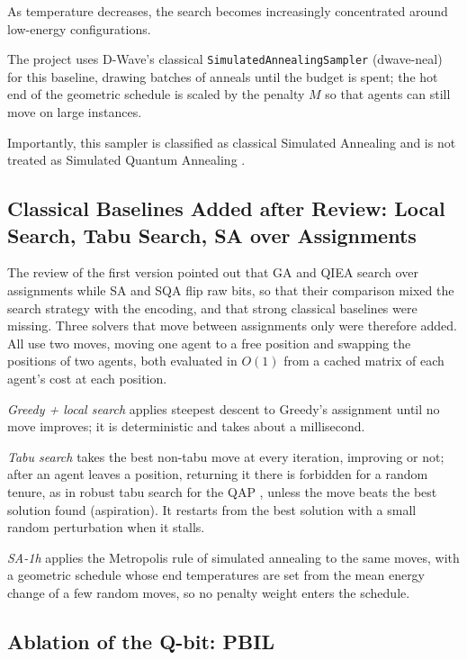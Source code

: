 \documentclass[12pt, a4paper]{article}
\begin{document}
As temperature decreases, the search becomes increasingly concentrated around low-energy configurations.

The project uses D-Wave's classical \texttt{SimulatedAnnealingSampler} (dwave-neal) for this baseline, drawing batches of anneals until the budget is spent; the hot end of the geometric schedule is scaled by the penalty $M$ so that agents can still move on large instances.

Importantly, this sampler is classified as classical Simulated Annealing and is not treated as Simulated Quantum Annealing \cite{DWaveSamplers}.

\subsection*{Classical Baselines Added after Review: Local Search, Tabu Search, SA over Assignments}

The review of the first version pointed out that GA and QIEA search over assignments while SA and SQA flip raw bits, so that their comparison mixed the search strategy with the encoding, and that strong classical baselines were missing. Three solvers that move between assignments only were therefore added. All use two moves, moving one agent to a free position and swapping the positions of two agents, both evaluated in $O(1)$ from a cached matrix of each agent's cost at each position.

\textit{Greedy + local search} applies steepest descent to Greedy's assignment until no move improves; it is deterministic and takes about a millisecond.

\textit{Tabu search} \cite{Glover1989} takes the best non-tabu move at every iteration, improving or not; after an agent leaves a position, returning it there is forbidden for a random tenure, as in robust tabu search for the QAP \cite{Taillard1991}, unless the move beats the best solution found (aspiration). It restarts from the best solution with a small random perturbation when it stalls.

\textit{SA-1h} applies the Metropolis rule of simulated annealing to the same moves, with a geometric schedule whose end temperatures are set from the mean energy change of a few random moves, so no penalty weight enters the schedule.

\subsection*{Ablation of the Q-bit: PBIL}
\end{document}
